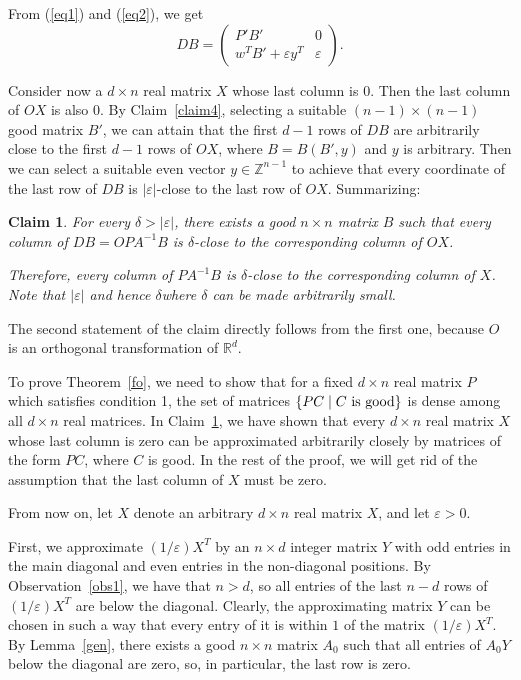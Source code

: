 \documentclass{article}
\newtheorem{claim}[theorem]{Claim}
\theoremstyle{definition}
\newcommand{\R}{\mathbb R}
\newcommand{\Z}{\mathbb Z}
\begin{document}
From (\ref{eq1}) and (\ref{eq2}), we get
\begin{equation}\label{eq3}
DB=\begin{pmatrix}P'B'&0\\w^T B'+\varepsilon y^T&\varepsilon\end{pmatrix}.
\end{equation}

Consider now a $d\times n$ real matrix $X$ whose last column is $0$. Then the last column of $OX$ is also $0$. By Claim~\ref{claim4}, selecting a suitable $(n-1)\times(n-1)$ good matrix $B'$, we can attain that the first $d-1$ rows of $DB$ are arbitrarily close to the first $d-1$ rows of $OX$, where $B=B(B',y)$ and $y$ is arbitrary. Then we can select a suitable even vector $y\in\Z^{n-1}$ to achieve that every coordinate of the last row of $DB$ is $|\varepsilon|$-close to the last row of $OX$. Summarizing:

\begin{claim}\label{claim6}
For every $\delta>|\varepsilon|$, there exists a good $n\times n$ matrix $B$ such that every column of $DB=OPA^{-1}B$  is $\delta$-close to the corresponding column of $OX$.

Therefore, every column of $PA^{-1}B$ is $\delta$-close to the corresponding column of $X$. Note that $|\varepsilon|$ and hence $\delta$where $\delta$ can be made arbitrarily small.
\end{claim}

The second statement of the claim directly follows from the first one, because $O$ is an orthogonal transformation of $\R^d$.
\smallskip

To prove Theorem~\ref{fo}, we need to show that for a fixed $d\times n$ real matrix $P$ which satisfies condition 1, the set of matrices $\{PC\mid C \hbox{ is good}\}$ is dense among all $d\times n$ real matrices.
In Claim~\ref{claim6}, we have shown that every $d\times n$ real matrix $X$ whose last column is zero can be approximated arbitrarily closely by matrices of the form $PC$, where $C$ is good. In the rest of the proof, we will get rid of the assumption that the last column of $X$ must be zero.
\smallskip

From now on, let $X$ denote an arbitrary $d\times n$ real matrix $X$, and let $\varepsilon>0$.

First, we approximate $(1/\varepsilon)X^T$ by an $n\times d$ integer matrix $Y$ with odd entries in the main diagonal and even entries in the non-diagonal positions. By Observation~\ref{obs1}, we have that $n>d$, so all entries of the last $n-d$ rows of $(1/\varepsilon)X^T$ are below the diagonal. Clearly, the approximating matrix $Y$ can be chosen in such a way that every entry of it is within $1$ of the matrix $(1/\varepsilon)X^T$.
By Lemma~\ref{gen}, there exists a good $n\times n$ matrix $A_0$ such that all entries of $A_0Y$ below the diagonal are zero, so, in particular, the last row is zero.
\smallskip
\end{document}
